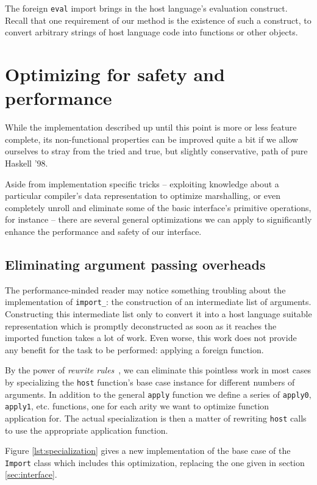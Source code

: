 \documentclass[preprint]{sigplanconf}
\begin{document}
The foreign \lstinline!eval! import brings in the host language's evaluation
construct. Recall that one requirement of our method is the existence of such
a construct, to convert arbitrary strings of host language code into functions
or other objects.

\section{Optimizing for safety and performance}
\label{sec:optimizations}
While the implementation described up until this point is more or less
feature complete, its non-functional properties can be improved quite a bit
if we allow ourselves to stray from the tried and true, but slightly
conservative, path of pure Haskell '98.

Aside from implementation specific tricks -- exploiting knowledge about a
particular compiler's data representation to optimize marshalling, or even
completely unroll and eliminate some of the basic interface's primitive
operations, for instance -- there are several general optimizations we can
apply to significantly enhance the performance and safety of our interface.

\subsection{Eliminating argument passing overheads}
\label{sec:specialization}
The performance-minded reader may notice something troubling about the
implementation of \lstinline!import_!: the construction of an intermediate list
of arguments. Constructing this intermediate list only to convert it into a
host language suitable representation which is promptly deconstructed as soon
as it reaches the imported function takes a lot of work. Even worse, this work
does not provide any benefit for the task to be performed: applying a foreign
function.

By the power of \emph{rewrite rules}\ \cite{rewriterules}, we can
eliminate this pointless work in most cases by specializing the
\lstinline!host! function's base case instance for different numbers of
arguments.
In addition to the general \lstinline!apply! function we define a series of
\lstinline!apply0!, \lstinline!apply1!, etc. functions, one for each arity
we want to optimize function application for.
The actual specialization is then a matter of
rewriting \lstinline!host! calls to use the appropriate application function.

Figure \ref{lst:specialization} gives a new implementation of the base case
of the \lstinline!Import! class which includes this optimization, replacing
the one given in section \ref{sec:interface}.
\end{document}
